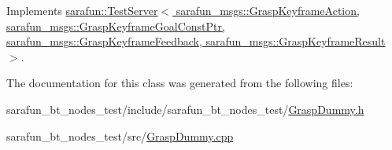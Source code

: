 Implements \hyperlink{classsarafun_1_1TestServer_a85b9721105c2a4b46bae26428433513e}{sarafun\-::\-Test\-Server$<$ sarafun\-\_\-msgs\-::\-Grasp\-Keyframe\-Action, sarafun\-\_\-msgs\-::\-Grasp\-Keyframe\-Goal\-Const\-Ptr, sarafun\-\_\-msgs\-::\-Grasp\-Keyframe\-Feedback, sarafun\-\_\-msgs\-::\-Grasp\-Keyframe\-Result $>$}.



The documentation for this class was generated from the following files\-:\begin{DoxyCompactItemize}
\item 
sarafun\-\_\-bt\-\_\-nodes\-\_\-test/include/sarafun\-\_\-bt\-\_\-nodes\-\_\-test/\hyperlink{GraspDummy_8h}{Grasp\-Dummy.\-h}\item 
sarafun\-\_\-bt\-\_\-nodes\-\_\-test/src/\hyperlink{GraspDummy_8cpp}{Grasp\-Dummy.\-cpp}\end{DoxyCompactItemize}
